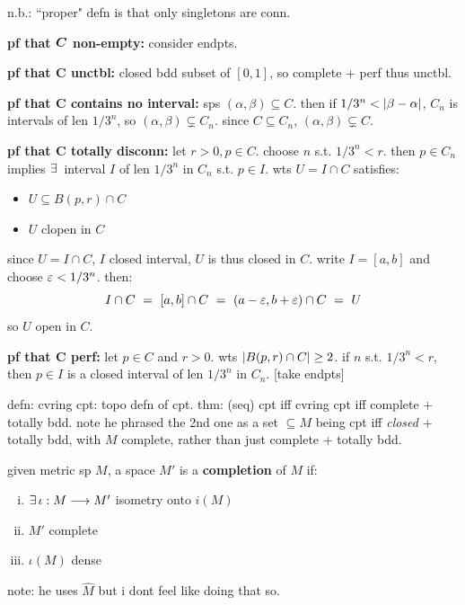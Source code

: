 n.b.: ``proper" defn is that only singletons are conn.

\textbf{pf that $\bm{C}$ non-empty:} consider endpts.

\textbf{pf that $\bm{C}$ unctbl:}
closed bdd subset of $[0,1]$, so complete + perf thus unctbl.

\textbf{pf that $\bm{C}$ contains no interval:}
sps $(\alpha,\beta)\subseteq C$.
then if $1/3^{n}<\abs{\beta-\alpha}$, $C_{n}$ is intervals of len $1/3^{n}$,
so $(\alpha,\beta)\subsetneq C_{n}$.
since $C\subseteq C_{n}$, $(\alpha,\beta)\subsetneq C$.

\textbf{pf that $\bm{C}$ totally disconn:}
let $r>0,p\in C$. choose $n$ s.t. $1/3^{n}<r$.
then $p\in C_{n}$ implies $\ex$ interval $I$ of len $1/3^{n}$ in $C_{n}$
s.t. $p\in I$. wts $U=I\cap C$ satisfies:
\begin{itemize}
    \item $U\subseteq B(p,r)\cap C$
	\item $U$ clopen in $C$
\end{itemize}
since $U=I\cap C$, $I$ closed interval, $U$ is thus closed in $C$.
write $I=[a,b]$ and choose $\varepsilon<1/3^{n}$. then:
\begin{equation*}
	I\cap C \ = \ [a,b]\cap C \ = \ (a-\ep,b+\ep)\cap C \ = \ U
\end{equation*}
so $U$ open in $C$.

\textbf{pf that $\bm{C}$ perf:}
let $p\in C$ and $r>0$. wts $\abs{B(p,r)\cap C}\geq2$.
if $n$ s.t. $1/3^{n}<r$, then $p\in I$ is a closed interval of len $1/3^{n}$
in $C_{n}$.
[take endpts]



defn: cvring cpt: topo defn of cpt.
thm: (seq) cpt iff cvring cpt iff complete + totally bdd.
note he phrased the 2nd one as a set $\subseteq M$ being cpt iff \textit{closed} + totally bdd,
with $M$ complete, rather than just complete + totally bdd.

\begin{defn}
    given metric sp $M$, a space $M'$ is a \textbf{completion} of $M$ if:
	\begin{enumerate}[i)]
		\item $\ex\iota:M\gto M'$ isometry onto $i(M)$
		\item $M'$ complete
		\item $\iota(M)$ dense
	\end{enumerate}
\end{defn}
note: he uses $\hat{M}$ but i dont feel like doing that so.

